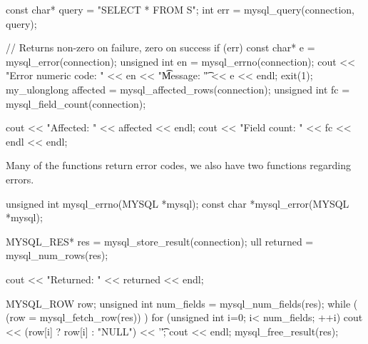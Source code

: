 \documentclass{report}
\begin{document}
    \pagebreak 
    \bigbreak \noindent 
    \begin{cppcode}
    const char* query = "SELECT * FROM S";
    int err = mysql_query(connection, query);

    // Returns non-zero on failure, zero on success
    if (err) {
        const char* e = mysql_error(connection);
        unsigned int en = mysql_errno(connection);
        cout << "Error numeric code: " << en << "\t Message: \t" << e << endl;
        exit(1);
    }
    my_ulonglong affected = mysql_affected_rows(connection);
    unsigned int fc = mysql_field_count(connection);

    cout << "Affected: " << affected << endl;
    cout << "Field count: " << fc << endl << endl;

    \end{cppcode}
    \bigbreak \noindent 

    \pagebreak 
    \bigbreak \noindent 
    Many of the functions return error codes, we also have two functions regarding errors.
    \bigbreak \noindent 
    \begin{cppcode}
    unsigned int mysql_errno(MYSQL *mysql);
    const char *mysql_error(MYSQL *mysql);
    \end{cppcode}


    \pagebreak 
    \bigbreak \noindent 
    \begin{cppcode}
        MYSQL_RES* res = mysql_store_result(connection);
        ull returned = mysql_num_rows(res);

        cout << "Returned: " << returned << endl;

        MYSQL_ROW row;
        unsigned int num_fields = mysql_num_fields(res);
        while ( (row = mysql_fetch_row(res)) ) {
            for (unsigned int i=0; i< num_fields; ++i) {
                cout << (row[i] ? row[i] : "NULL") << '\t';
            }
            cout << endl;
        }
        mysql_free_result(res);
    \end{cppcode}
\end{document}
